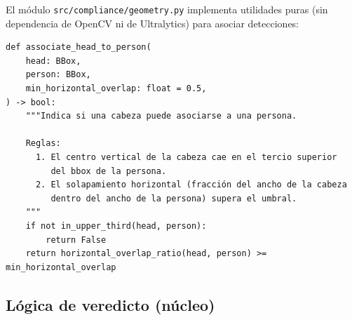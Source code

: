 \documentclass[11pt,a4paper]{article}
\begin{document}
El módulo \texttt{src/compliance/geometry.py} implementa utilidades
puras (sin dependencia de OpenCV ni de Ultralytics) para asociar
detecciones:

\begin{lstlisting}[caption={Asociación cabeza-persona: tercio superior
+ solapamiento horizontal.}]
def associate_head_to_person(
    head: BBox,
    person: BBox,
    min_horizontal_overlap: float = 0.5,
) -> bool:
    """Indica si una cabeza puede asociarse a una persona.

    Reglas:
      1. El centro vertical de la cabeza cae en el tercio superior
         del bbox de la persona.
      2. El solapamiento horizontal (fracción del ancho de la cabeza
         dentro del ancho de la persona) supera el umbral.
    """
    if not in_upper_third(head, person):
        return False
    return horizontal_overlap_ratio(head, person) >= min_horizontal_overlap
\end{lstlisting}

\subsection{Lógica de veredicto (núcleo)}
\end{document}
